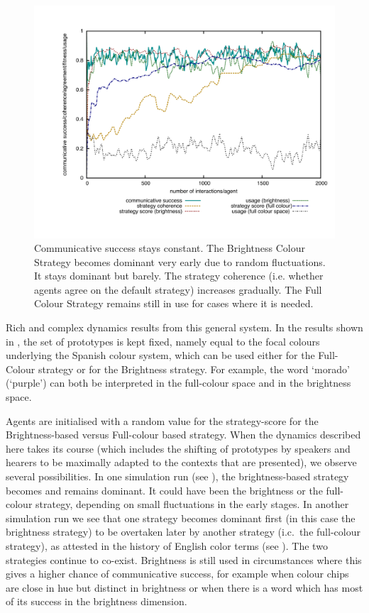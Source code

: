 \begin{figure}[b]
\centerline{\includegraphics[width=.9\textwidth]{chap12/figs/strategies-one-winner.pdf}}
\caption{{Communicative success stays constant. The Brightness Colour Strategy becomes 
dominant very early due to random fluctuations. It stays dominant but barely. 
The strategy coherence (i.e. whether agents agree on the 
default strategy) increases gradually. The Full Colour Strategy remains still in use for cases where
it is needed. \label{fig:strategies-one}}}
\end{figure}

Rich and complex dynamics results from this general system. In the results shown in , the 
set of prototypes is kept fixed, namely equal to the focal colours underlying 
the Spanish colour system, which can be used either for the Full-Colour strategy or for the Brightness strategy. 
For example, the word `morado' (`purple') can both be interpreted in the full-colour space and in the brightness space. 

Agents are initialised with a random value for the strategy-score for the Brightness-based versus
Full-colour based strategy. When the dynamics described here takes its 
course (which includes the shifting of prototypes by speakers and hearers to be maximally adapted to the 
contexts that are presented), we observe several possibilities. In one simulation run (see ), 
the brightness-based strategy becomes and remains dominant. It could have been the brightness 
or the full-colour strategy, depending on small fluctuations in the early stages. 
In another simulation run we see that one strategy becomes dominant first (in this case the brightness strategy) 
to be overtaken later by another strategy (i.c.\ the full-colour strategy), 
as attested in the history of English color terms (see ). 
The two strategies continue to co-exist. Brightness is still used in 
circumstances where this gives a higher chance of communicative success, for example when colour chips are 
close in hue but distinct in brightness or when there is a word which has most of its success in the brightness 
dimension. 


